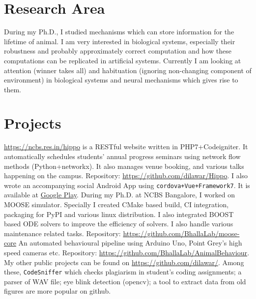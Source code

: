 \documentclass[11pt,a4paper, colorlinks=true, linkcolor=cyan]{moderncv}
\begin{document}
\section{Research Area}
{}{}{}
{
    During my Ph.D., I studied mechanisms which can store information for the lifetime
    of animal. I am very interested in biological systems, especially their
    robustness and probably approximately correct computation and how these
    computations can be replicated in artificial systems.
    Currently I am looking at attention (winner takes all) and habituation (ignoring non-changing
    component of environment) in biological systems and neural mechanisms which
    gives rise to them.
}

\section{Projects}
{}{}{}
{
    \href{NCBS Hippo}{https://ncbs.res.in/hippo} is a RESTful
    website written in PHP7+Codeigniter. It automatically schedules students'
    annual progress seminars using network flow methods (Python+networkx). It also
    manages venue booking, and various talks happening on the campus. 
    Repository: \url{https://github.com/dilawar/Hippo}.
    I also wrote an accompanying social Android App using
    \texttt{cordova+Vue+Framework7}. It is available at
    \href{https://play.google.com/store/apps/details?id=com.dilawar.hippo}{Google Play}.
}
{}{}{}
{
    During my Ph.D. at NCBS Bangalore, I worked on MOOSE simulator. Specially I
    created CMake based build, CI integration, packaging for PyPI and various
    linux distribution. I also integrated BOOST based ODE solvers to improve the
    efficiency of solvers. I also handle various maintenance related tasks. 
    Repository: \url{https://github.com/BhallaLab/moose-core}
}
{}{}{}
{
    An automated behavioural pipeline using Arduino Uno, Point Grey's high speed
    cameras etc.  
    Repository: \url{https://github.com/BhallaLab/AnimalBehaviour}.
}
{}{}{}
{
    My other public projects can be found on \url{https://github.com/dilawar/}.
    Among these, \texttt{CodeSniffer} which checks plagiarism in student's coding
    assignments; a parser of WAV file; eye blink detection (opencv); a tool to
    extract data from old figures are more popular on github.
}
\end{document}
